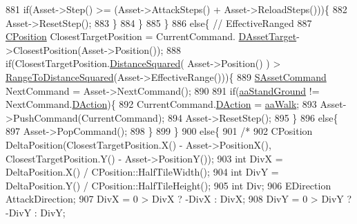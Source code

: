 \begin{DoxyCode}
{881                         \textcolor{keywordflow}{if}(Asset->Step() >= (Asset->AttackSteps() + Asset->ReloadSteps()))\{
882                            Asset->ResetStep();
883                         \}
884                     \}
885                 \}
886                 \textcolor{keywordflow}{else}\{ \textcolor{comment}{// EffectiveRanged}
887                     \hyperlink{classCPosition}{CPosition} ClosestTargetPosition = CurrentCommand.
      \hyperlink{structSAssetCommand_a3d9b43f6e59c386c48c41a65448a0c39}{DAssetTarget}->ClosestPosition(Asset->Position());
888                     \textcolor{keywordflow}{if}(ClosestTargetPosition.\hyperlink{classCPosition_acd96d507f44c0fdf13036ebc1a09e59c}{DistanceSquared}( Asset->Position() ) > 
      \hyperlink{GameModel_8cpp_afd5c111a1369dc53d1b1230506e99f7c}{RangeToDistanceSquared}(Asset->EffectiveRange()))\{
889                         \hyperlink{structSAssetCommand}{SAssetCommand} NextCommand = Asset->NextCommand();
890                         
891                         \textcolor{keywordflow}{if}(\hyperlink{GameDataTypes_8h_ab47668e651a3032cfb9c40ea2d60d670abd8a4e07a8f888148ed62ddd46719af3}{aaStandGround} != NextCommand.\hyperlink{structSAssetCommand_a8edd3b3d59a76d5514ba403bc8076a75}{DAction})\{
892                             CurrentCommand.\hyperlink{structSAssetCommand_a8edd3b3d59a76d5514ba403bc8076a75}{DAction} = \hyperlink{GameDataTypes_8h_ab47668e651a3032cfb9c40ea2d60d670a60ca9010aa62b73c1aab838ff4bf7276}{aaWalk};
893                             Asset->PushCommand(CurrentCommand);
894                             Asset->ResetStep();
895                         \}
896                         \textcolor{keywordflow}{else}\{
897                             Asset->PopCommand();
898                         \}   
899                     \}
900                     \textcolor{keywordflow}{else}\{
901                         \textcolor{comment}{/*}
902 \textcolor{comment}{                        CPosition DeltaPosition(ClosestTargetPosition.X() - Asset->PositionX(),
       ClosestTargetPosition.Y() - Asset->PositionY());}
903 \textcolor{comment}{                        int DivX = DeltaPosition.X() / CPosition::HalfTileWidth();}
904 \textcolor{comment}{                        int DivY = DeltaPosition.Y() / CPosition::HalfTileHeight();}
905 \textcolor{comment}{                        int Div;}
906 \textcolor{comment}{                        EDirection AttackDirection;}
907 \textcolor{comment}{                        DivX = 0 > DivX ? -DivX : DivX;}
908 \textcolor{comment}{                        DivY = 0 > DivY ? -DivY : DivY;}
}
\end{DoxyCode}
